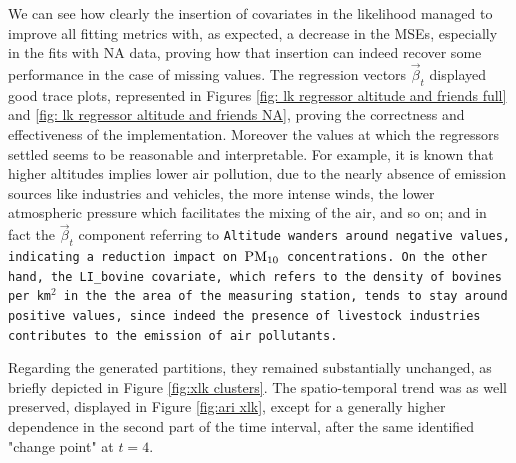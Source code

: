 \documentclass[12pt,	%
	a4paper,		%
	twoside,		%
	openright,		%
	titlepage,%
	]{book}
\theoremstyle{definition}
\begin{document}
We can see how clearly the insertion of covariates in the likelihood managed to improve all fitting metrics with, as expected, a decrease in the MSEs, especially in the fits with NA data, proving how that insertion can indeed recover some performance in the case of missing values. The regression vectors $\vec{\beta}_t$ displayed good trace plots, represented in Figures \ref{fig: lk regressor altitude and friends full} and \ref{fig: lk regressor altitude and friends NA}, proving the correctness and effectiveness of the implementation. Moreover the values at which the regressors settled seems to be reasonable and interpretable. For example, it is known that higher altitudes implies lower air pollution, due to the nearly absence of emission sources like industries and vehicles, the more intense winds, the lower atmospheric pressure which facilitates the mixing of the air, and so on; and in fact the $\vec{\beta}_t$ component referring to \tt{Altitude} wanders around negative values, indicating a reduction impact on $\text{PM}_{10}$ concentrations. On the other hand, the \tt{LI\_bovine} covariate, which refers to the density of bovines per km$^2$ in the the area of the measuring station, tends to stay around positive values, since indeed the presence of livestock industries contributes to the emission of air pollutants.


Regarding the generated partitions, they remained substantially unchanged, as briefly depicted in Figure \ref{fig:xlk clusters}. The spatio-temporal trend was as well preserved, displayed in Figure \ref{fig:ari xlk}, except for a generally higher dependence in the second part of the time interval, after the same identified "change point" at $t=4$.  
\end{document}
